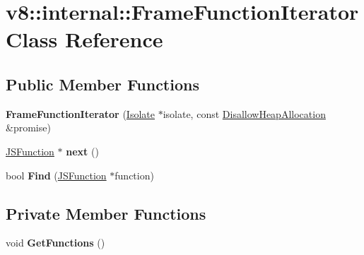 \hypertarget{classv8_1_1internal_1_1_frame_function_iterator}{}\section{v8\+:\+:internal\+:\+:Frame\+Function\+Iterator Class Reference}
\label{classv8_1_1internal_1_1_frame_function_iterator}
\subsection*{Public Member Functions}
\begin{DoxyCompactItemize}
\item 
{\bfseries Frame\+Function\+Iterator} (\hyperlink{classv8_1_1internal_1_1_isolate}{Isolate} $\ast$isolate, const \hyperlink{classv8_1_1internal_1_1_per_thread_assert_scope_debug_only}{Disallow\+Heap\+Allocation} \&promise)\hypertarget{classv8_1_1internal_1_1_frame_function_iterator_a6779f983e3e413a198dc6e6e24820903}{}\label{classv8_1_1internal_1_1_frame_function_iterator_a6779f983e3e413a198dc6e6e24820903}

\item 
\hyperlink{classv8_1_1internal_1_1_j_s_function}{J\+S\+Function} $\ast$ {\bfseries next} ()\hypertarget{classv8_1_1internal_1_1_frame_function_iterator_ad9c0f74e2f1f16ddaf19736fc9eb4148}{}\label{classv8_1_1internal_1_1_frame_function_iterator_ad9c0f74e2f1f16ddaf19736fc9eb4148}

\item 
bool {\bfseries Find} (\hyperlink{classv8_1_1internal_1_1_j_s_function}{J\+S\+Function} $\ast$function)\hypertarget{classv8_1_1internal_1_1_frame_function_iterator_a0f6b3608e8dd05045ad7376ba69b26b6}{}\label{classv8_1_1internal_1_1_frame_function_iterator_a0f6b3608e8dd05045ad7376ba69b26b6}

\end{DoxyCompactItemize}
\subsection*{Private Member Functions}
\begin{DoxyCompactItemize}
\item 
void {\bfseries Get\+Functions} ()\hypertarget{classv8_1_1internal_1_1_frame_function_iterator_ae97badd64b0b5845fde03bdcfef65468}{}\label{classv8_1_1internal_1_1_frame_function_iterator_ae97badd64b0b5845fde03bdcfef65468}

\end{DoxyCompactItemize}

